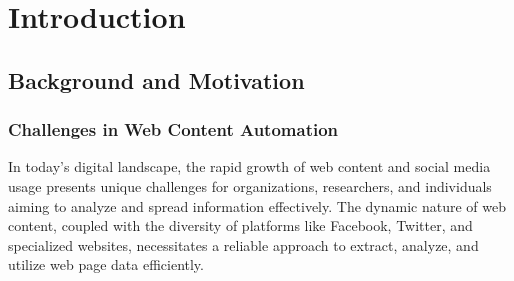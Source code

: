 
\chapter{Introduction}
\label{ch:introduction}


\section{Background and Motivation}
\label{sec:background_and_motivation}

\subsection{Challenges in Web Content Automation}
\label{subsec:challenges_in_web_content_automation}
In today's digital landscape, the rapid growth of web content and social media usage presents unique challenges for organizations, researchers, and individuals aiming to analyze and spread information effectively. The dynamic nature of web content, coupled with the diversity of platforms like Facebook, Twitter, and specialized websites, necessitates a reliable approach to extract, analyze, and utilize web page data efficiently.

